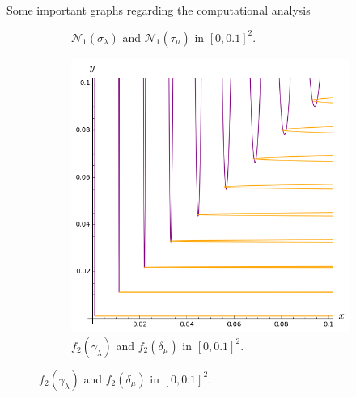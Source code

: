 \documentclass[final]{beamer}
\newlength{\onecolwid}
\newlength{\twocolwid}
\begin{document}
\begin{frame}[t]
\begin{columns}[t]
\begin{column}{\twocolwid}
\begin{alertblock}{Some important graphs regarding the computational analysis}
\begin{center}
\begin{figure}
\begin{subfigure}{.28\linewidth}
\vspace{-0.1cm}\caption{$\mathcal{N}_1(\sigma_\lambda)$ and $\mathcal{N}_1(\tau_\mu)$ in $[0, 0.1]^2$.}\label{curve}
\end{subfigure}
\hspace{2cm}
\begin{subfigure}{.28\linewidth}\centering
\includegraphics[width=1\textwidth]{plots/ch5_30_3curves5.png}
\vspace{-0.1cm}\caption{$f_2(\gamma_{\lambda})$ and $f_2(\delta_{\mu})$ in $[0, 0.1]^2$.}\label{curvef2}
\end{subfigure}
\end{figure}
\end{center}
\vspace{-1.5cm}
\end{alertblock}

 
\vspace{-2cm}
 
\begin{columns}[t,totalwidth=\twocolwid] %
 
\begin{column}{\onecolwid} %
 

\end{column}
\end{columns}
\end{column}
\end{columns}
\end{frame}
\end{document}
